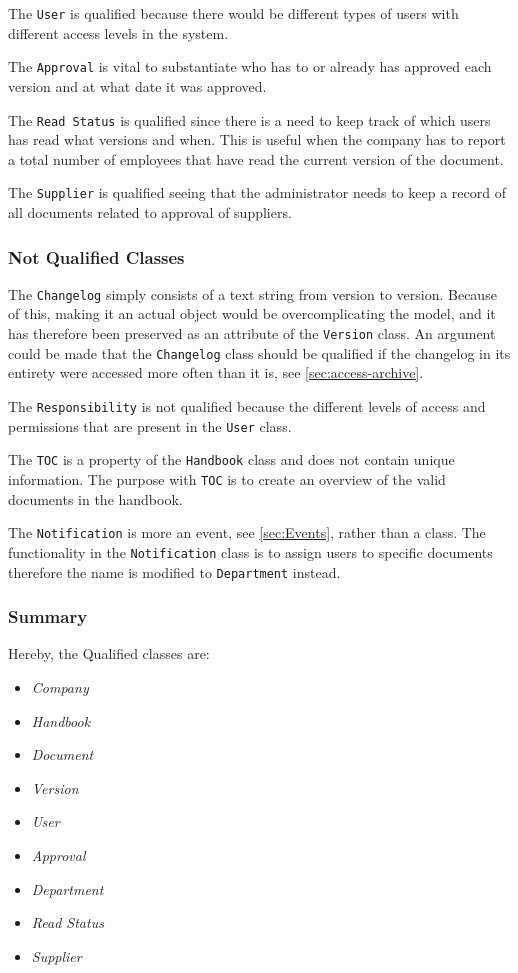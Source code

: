 The \texttt{User} is qualified because there would be different types of users with different access levels in the system.

The \texttt{Approval} is vital to substantiate who has to or already has approved each version and at what date it was approved.

The \texttt{Read Status} is qualified since there is a need to keep track of which users has read what versions and when.
This is useful when the company has to report a total number of employees that have read the current version of the document.

The \texttt{Supplier} is qualified seeing that the administrator needs to keep a record of all documents related to approval of suppliers.

\subsubsection*{Not Qualified Classes}

The \texttt{Changelog} simply consists of a text string from version to version.
Because of this, making it an actual object would be overcomplicating the model, and it has therefore been preserved as an attribute of the \texttt{Version} class.
An argument could be made that the \texttt{Changelog} class should be qualified if the changelog in its entirety were accessed more often than it is, see \cref{sec:access-archive}.

The \texttt{Responsibility} is not qualified because the different levels of access and permissions that are present in the \texttt{User} class.

The \texttt{TOC} is a property of the \texttt{Handbook} class and does not contain unique information.
The purpose with \texttt{TOC} is to create an overview of the valid documents in the handbook.

The \texttt{Notification} is more an event, see \cref{sec:Events}, rather than a class.
The functionality in the \texttt{Notification} class is to assign users to specific documents therefore the name is modified to \texttt{Department} instead.

\subsubsection*{Summary}
Hereby, the Qualified classes are:
\begin{multicols}{4}
	\begin{itemize}
	\item \textit{Company}
	\item \textit{Handbook}
	\item \textit{Document}
	\item \textit{Version}
	\item \textit{User}
	\item \textit{Approval}
	\item \textit{Department}
	\item \textit{Read Status}
	\item \textit{Supplier}
	\end{itemize}
\end{multicols}

